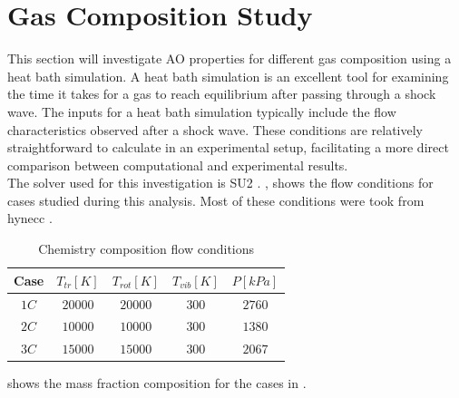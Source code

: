 \section{Gas Composition Study\label{ch5:chemistryCompositionStudyMassFraction}}
This section will investigate \gls{AO} properties for different gas composition
using a heat bath simulation. A heat bath simulation is an
excellent tool for examining the time it takes for a gas to reach equilibrium
after passing through a shock wave. The inputs for a heat bath simulation
typically include the flow characteristics observed after a shock wave. These
conditions are relatively straightforward to calculate in an experimental
setup, facilitating a more direct comparison between computational and
experimental results. \\

The solver used for this investigation is \gls{SU2} \cite{Palacios2013a}. , shows the flow conditions for
cases studied during this analysis. Most of these conditions were took from
\gls{hynecc} \cite{Gimelshein2022}. 
\begin{table}[H]
    \begin{center}
        \begin{tabular}{|c|c|c|c|c|}
        \hline
         Case & $T_{tr}\left[K\right]$ & $T_{rot}\left[K\right]$ &
            $T_{vib}\left[K\right]$ &  $P\left[kPa\right]$ \\ \hline\hline
            $1C$\cite{Gimelshein2022} & $20000$ & $20000$ & $300$ & $2760$ \\ \hline 
            $2C$\cite{Gimelshein2022} & $10000$ & $10000$ & $300$ & $1380$ \\ \hline 
            $3C$\cite{Gimelshein2022} & $15000$ & $15000$ & $300$ & $2067$ \\ \hline
        \end{tabular}
        \caption{Chemistry composition flow conditions}\label{tab:chemistryCompositionStudyMassFraction}
    \end{center}
\end{table}

     shows the mass
    fraction composition for the cases in . 

